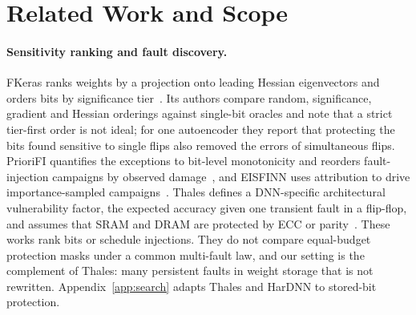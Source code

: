 \section{Related Work and Scope}\label{sec:related}
\paragraph{Sensitivity ranking and fault discovery.} FKeras ranks weights by a projection onto leading Hessian eigenvectors and orders bits by significance tier~\cite{weng2024fkeras}. Its authors compare random, significance, gradient and Hessian orderings against single-bit oracles and note that a strict tier-first order is not ideal; for one autoencoder they report that protecting the bits found sensitive to single flips also removed the errors of simultaneous flips. PrioriFI quantifies the exceptions to bit-level monotonicity and reorders fault-injection campaigns by observed damage~\cite{weng2026priorifi}, and EISFINN uses attribution to drive importance-sampled campaigns~\cite{colucci2024eisfinn}. Thales defines a DNN-specific architectural vulnerability factor, the expected accuracy given one transient fault in a flip-flop, and assumes that SRAM and DRAM are protected by ECC or parity~\cite{tyagi2023thales}. These works rank bits or schedule injections. They do not compare equal-budget protection masks under a common multi-fault law, and our setting is the complement of Thales: many persistent faults in weight storage that is not rewritten. Appendix~\ref{app:search} adapts Thales and HarDNN to stored-bit protection.

